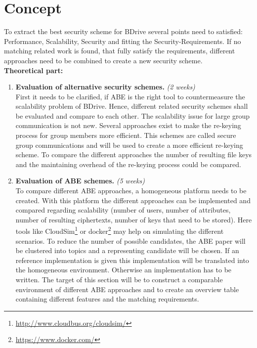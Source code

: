 \documentclass[twocolumn]{article}
\begin{document}
\section{Concept}
To extract the best security scheme for BDrive several points need to satisfied: Performance, Scalability, Security and fitting the Security-Requirements. If no matching related work is found, that fully satisfy the requirements, different approaches need to be combined to create a new security scheme.\\

\noindent \textbf{Theoretical part:}
\begin{enumerate}
	\item\textbf{Evaluation of alternative security schemes.} \textit{(2 weeks)} \\
		  First it needs to be clarified, if ABE is the right tool to countermeasure the scalability problem of BDrive. Hence, different related security schemes shall be evaluated and compare to each other. The scalability issue for large group communication is not new. Several approaches exist to make the re-keying process for group members more efficient. This schemes are called secure group communications and will be used to create a more efficient re-keying scheme.\cite{wong2000secure}
		  To compare the different approaches the number of resulting file keys and the maintaining overhead of the re-keying process could be compared. 

	\item\textbf{Evaluation of ABE schemes.} \textit{(5 weeks)} \\
		  To compare different ABE approaches, a homogeneous platform needs to be created. With this platform the different approaches can be implemented and compared regarding scalability (number of users, number of attributes, number of resulting ciphertexts, number of keys that need to be stored). Here tools like CloudSim\footnote{\url{http://www.cloudbus.org/cloudsim/}} or docker\footnote{\url{https://www.docker.com/}} may help on simulating the different scenarios. To reduce the number of possible candidates, the ABE paper will be clustered into topics and a representing candidate will be chosen. If an reference implementation is given this implementation will be translated into the homogeneous environment. Otherwise an implementation has to be written. 
		  The target of this section will be to construct a comparable environment of different ABE approaches and to create an overview table containing different features and the matching requirements.


\end{enumerate}
\end{document}
